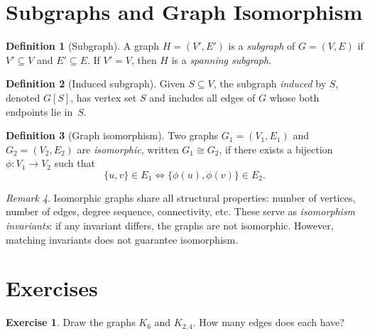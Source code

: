 \documentclass[12pt,a4paper,openany]{book}
\theoremstyle{definition}
\newtheorem{definition}{Definition}[chapter]
\newtheorem{exercise}{Exercise}[chapter]
\theoremstyle{plain}
\theoremstyle{remark}
\newtheorem{remark}[definition]{Remark}
\begin{document}
\section{Subgraphs and Graph Isomorphism}\label{sec:subgraphs-iso}

\begin{definition}[Subgraph]\label{def:subgraph}
A graph $H = (V', E')$ is a \emph{subgraph} of $G = (V, E)$ if
$V' \subseteq V$ and $E' \subseteq E$.  If $V' = V$, then $H$ is a
\emph{spanning subgraph}.
\end{definition}

\begin{definition}[Induced subgraph]\label{def:induced-subgraph}
Given $S \subseteq V$, the subgraph \emph{induced} by $S$, denoted
$G[S]$, has vertex set $S$ and includes all edges of $G$ whose both
endpoints lie in~$S$.
\end{definition}

\begin{definition}[Graph isomorphism]\label{def:isomorphism}
Two graphs $G_1 = (V_1, E_1)$ and $G_2 = (V_2, E_2)$ are
\emph{isomorphic}, written $G_1 \cong G_2$, if there exists a bijection
$\phi \colon V_1 \to V_2$ such that
\[
   \{u, v\} \in E_1 \iff \{\phi(u), \phi(v)\} \in E_2.
\]
\end{definition}

\begin{remark}\label{rem:iso-invariants}
Isomorphic graphs share all structural properties: number of vertices,
number of edges, degree sequence, connectivity, etc.  These serve as
\emph{isomorphism invariants}: if any
invariant differs, the graphs are not isomorphic.  However, matching
invariants does not guarantee isomorphism.
\end{remark}

\section{Exercises}\label{sec:graph-exercises}

\begin{exercise}\label{exo:graph1}
Draw the graphs $K_6$ and $K_{2,4}$.  How many edges does each have?
\end{exercise}
\end{document}
